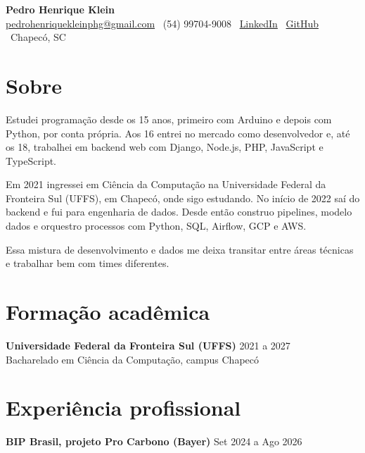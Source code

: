 \documentclass[a4paper,10pt]{article}
\begin{document}
\begin{center}
    {\LARGE \textbf{Pedro Henrique Klein}}\\
    \vspace{0.2cm}
    \href{mailto:pedrohenriquekleinphg@gmail.com}{pedrohenriquekleinphg@gmail.com} \textbar\
    (54) 99704-9008 \textbar\
    \href{https://www.linkedin.com/in/pedro-henrique-klein-a41122221/}{LinkedIn} \textbar\
    \href{https://github.com/Pedrinhonitz}{GitHub} \textbar\
    Chapecó, SC
\end{center}

\vspace{0.3cm}

\section*{Sobre}

Estudei programação desde os 15 anos, primeiro com Arduino e depois com Python, por conta própria. Aos 16 entrei no mercado como desenvolvedor e, até os 18, trabalhei em backend web com Django, Node.js, PHP, JavaScript e TypeScript.

Em 2021 ingressei em Ciência da Computação na Universidade Federal da Fronteira Sul (UFFS), em Chapecó, onde sigo estudando. No início de 2022 saí do backend e fui para engenharia de dados. Desde então construo pipelines, modelo dados e orquestro processos com Python, SQL, Airflow, GCP e AWS.

Essa mistura de desenvolvimento e dados me deixa transitar entre áreas técnicas e trabalhar bem com times diferentes.

\section*{Formação acadêmica}

\textbf{Universidade Federal da Fronteira Sul (UFFS)} \hfill 2021 a 2027 \\
Bacharelado em Ciência da Computação, campus Chapecó

\section*{Experiência profissional}

\textbf{BIP Brasil, projeto Pro Carbono (Bayer)} \hfill Set 2024 a Ago 2026
\end{document}
